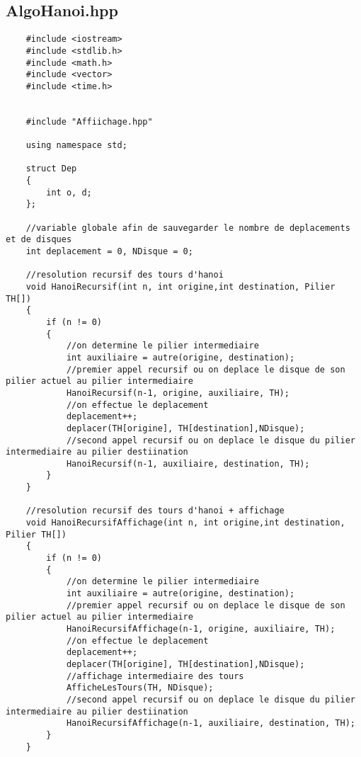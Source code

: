 \subsection{AlgoHanoi.hpp}
\begin{verbatim}
    #include <iostream>
    #include <stdlib.h>
    #include <math.h>
    #include <vector>
    #include <time.h>
    
    
    #include "Affiichage.hpp"
    
    using namespace std;
    
    struct Dep
    {
        int o, d;
    };
    
    //variable globale afin de sauvegarder le nombre de deplacements et de disques
    int deplacement = 0, NDisque = 0;
    
    //resolution recursif des tours d'hanoi
    void HanoiRecursif(int n, int origine,int destination, Pilier TH[])
    {
        if (n != 0)
        {
            //on determine le pilier intermediaire
            int auxiliaire = autre(origine, destination);
            //premier appel recursif ou on deplace le disque de son pilier actuel au pilier intermediaire
            HanoiRecursif(n-1, origine, auxiliaire, TH);
            //on effectue le deplacement
            deplacement++;
            deplacer(TH[origine], TH[destination],NDisque);
            //second appel recursif ou on deplace le disque du pilier intermediaire au pilier destiination
            HanoiRecursif(n-1, auxiliaire, destination, TH);
        }
    }
    
    //resolution recursif des tours d'hanoi + affichage
    void HanoiRecursifAffichage(int n, int origine,int destination, Pilier TH[])
    {
        if (n != 0)
        {
            //on determine le pilier intermediaire
            int auxiliaire = autre(origine, destination);
            //premier appel recursif ou on deplace le disque de son pilier actuel au pilier intermediaire
            HanoiRecursifAffichage(n-1, origine, auxiliaire, TH);
            //on effectue le deplacement
            deplacement++;
            deplacer(TH[origine], TH[destination],NDisque);
            //affichage intermediaire des tours
            AfficheLesTours(TH, NDisque);
            //second appel recursif ou on deplace le disque du pilier intermediaire au pilier destiination
            HanoiRecursifAffichage(n-1, auxiliaire, destination, TH);
        }
    }
    

\end{verbatim}
